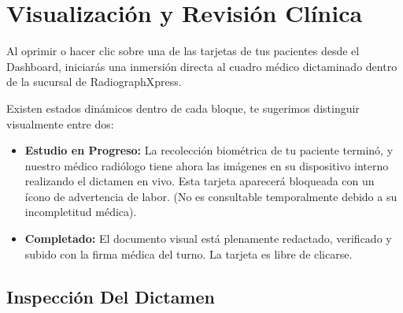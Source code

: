 \section{Visualización y Revisión Clínica}

Al oprimir o hacer clic sobre una de las tarjetas de tus pacientes desde el Dashboard, iniciarás una inmersión directa al cuadro médico dictaminado dentro de la sucursal de RadiographXpress.

Existen estados dinámicos dentro de cada bloque, te sugerimos distinguir visualmente entre dos:
\begin{itemize}
    \item \textbf{Estudio en Progreso:} La recolección biométrica de tu paciente terminó, y nuestro médico radiólogo tiene ahora las imágenes en su dispositivo interno realizando el dictamen en vivo. Esta tarjeta aparecerá bloqueada con un ícono de advertencia de labor. (No es consultable temporalmente debido a su incompletitud médica).
    \item \textbf{Completado:} El documento visual está plenamente redactado, verificado y subido con la firma médica del turno. La tarjeta es libre de clicarse.
\end{itemize}

\subsection{Inspección Del Dictamen}

